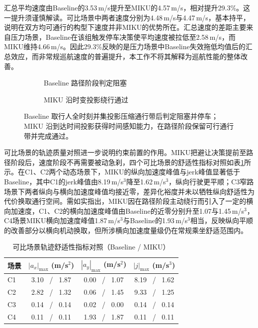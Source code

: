 \documentclass[a4paper,11pt]{ctexart}
\providecommand{\datapath}{../../图片/data/01_crossing_ped/}
\theoremstyle{definition}
\begin{document}
汇总平均速度由Baseline的3.53\,m/s提升至MIKU的4.57\,m/s，相对提升29.3\%。这一提升须谨慎解读。可比场景中两者速度分别为4.48\,m/s与4.47\,m/s，基本持平，说明在双方均可通行的构型下速度并非MIKU的优势所在。汇总速度的差距主要来自压力场景，Baseline在该组触发停车决策使平均速度被拉低至2.58\,m/s，而MIKU维持4.66\,m/s。因此29.3\%反映的是压力场景中Baseline失效拖低均值后的汇总效应，而非常规巡航速度的普遍提升，本工作不将其解释为巡航性能的整体改善。

\begin{figure}[htbp]
\centering
\begingroup
\renewcommand{\datapath}{../../图片/data/01_crossing_ped/}
\begin{subfigure}[b]{0.46\textwidth}
  \centering
  \caption{Baseline 路径阶段判定阻塞}
\end{subfigure}\hfill
\begin{subfigure}[b]{0.46\textwidth}
  \centering
  \caption{MIKU 沿时变投影绕行通过}
\end{subfigure}
\endgroup
\caption{压力场景 P1 单行人横穿的 SL 路径边界对照}
\caption*{Baseline 取行人全时刻并集投影压缩通行带后判定阻塞并停车；MIKU 沿到达时间投影获得时间感知能力，在路径阶段保留可行通行带并完成通过。}
\label{fig:exp_p1_sl}
\end{figure}

可比场景的轨迹质量对照进一步说明约束前置的作用。MIKU把避让决策提前至路径阶段后，速度阶段不再需要被动急刹，四个可比场景的舒适性指标对照如表\ref{tab:exp_comfort}所示。在C1、C2两个动态场景下，MIKU的纵向加速度峰值与jerk峰值显著低于Baseline，其中C1的jerk峰值由8.19\,m/s$^3$降至1.62\,m/s$^3$，纵向行驶更平顺；C3窄路场景下两者纵向与横向加速度峰值均接近零，差异化裕度并未以牺牲纵向舒适性为代价换取通行空间。需如实指出，MIKU因在路径阶段主动绕行而引入了一定的横向加速度，C1、C2的横向加速度峰值由Baseline的近零分别升至1.07与1.45\,m/s$^3$，C4场景MIKU横向加速度峰值1.87\,m/s$^3$与Baseline的1.93\,m/s$^3$相当，反映纵向平顺的改善部分以横向机动换取，但所涉横向加速度量级仍在常规乘坐舒适范围内。

\begin{table}[htbp]
\centering
\caption{可比场景轨迹舒适性指标对照（Baseline / MIKU）}
\label{tab:exp_comfort}
\small
\begin{tabular}{lccc}
\toprule
\textbf{场景} & \textbf{$|a_x|_{\max}$ (m/s$^2$)} & \textbf{$|a_y|_{\max}$ (m/s$^2$)} & \textbf{$|j|_{\max}$ (m/s$^3$)} \\
\midrule
C1 & 3.10 \ / \ 1.87 & 0.00 \ / \ 1.07 & 8.19 \ / \ 1.62 \\
C2 & 2.82 \ / \ 1.32 & 0.06 \ / \ 1.45 & 9.33 \ / \ 1.25 \\
C3 & 0.14 \ / \ 0.14 & 0.02 \ / \ 0.00 & 0.14 \ / \ 0.14 \\
C4 & 0.11 \ / \ 0.11 & 1.93 \ / \ 1.87 & 0.11 \ / \ 0.11 \\
\bottomrule
\end{tabular}
\end{table}
\end{document}
